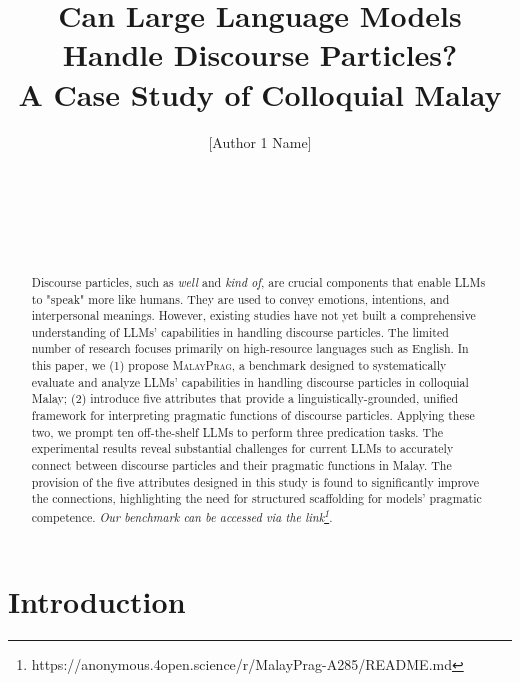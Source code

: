 \documentclass[11pt]{article}
\title{Can Large Language Models Handle Discourse Particles?\\A Case Study of Colloquial Malay}
\author{
  [Author 1 Name] \\
  [Affiliation 1] \\
  [email1@example.com]
  \And
  [Author 2 Name] \\
  [Affiliation 2] \\
  [email2@example.com]
  \AND
  [Author 3 Name] \\
  [Affiliation 3] \\
  [email3@example.com]
}
\begin{document}
\maketitle

\begin{abstract}
Discourse particles, such as \textit{well} and \textit{kind of}, are crucial components that enable LLMs to "speak" more like humans. They are used to convey emotions, intentions, and interpersonal meanings.
However, existing studies have not yet built a comprehensive understanding of LLMs’ capabilities in handling discourse particles. The limited number of research focuses primarily on high-resource languages such as English. 
In this paper, we (1) propose \textsc{MalayPrag}, a benchmark designed to systematically evaluate and analyze LLMs’ capabilities in handling discourse particles in colloquial Malay; (2) introduce five attributes that provide a linguistically-grounded, unified framework for interpreting pragmatic functions of discourse particles. 
Applying these two, we prompt ten off-the-shelf LLMs to perform three predication tasks. 
The experimental results reveal substantial challenges for current LLMs to accurately connect between discourse particles and their pragmatic functions in Malay. The provision of the five attributes designed in this study is found to significantly improve the connections,  highlighting the need for structured scaffolding for models' pragmatic competence.
\textit{Our benchmark can be accessed via the link\footnote{https://anonymous.4open.science/r/MalayPrag-A285/README.md}}.
\end{abstract}

\section{Introduction}
\end{document}
